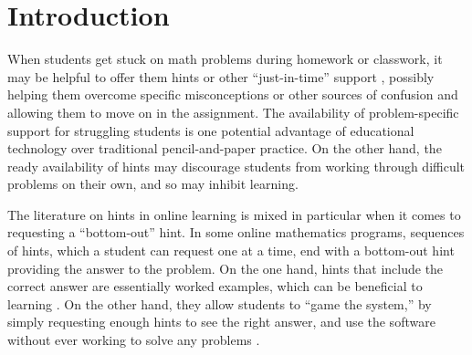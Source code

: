 \documentclass[]{article}
\begin{document}
\clearpage

\section{Introduction}



When students get stuck on math problems during homework or classwork, it may be helpful to offer them hints or other ``just-in-time'' support \cite[e.g][]{jit}, possibly helping them overcome specific misconceptions or other sources of confusion and allowing them to move on in the assignment.
The availability of problem-specific support for struggling students is one potential advantage of educational technology over traditional pencil-and-paper practice.
On the other hand, the ready availability of hints may discourage students from working through difficult problems on their own, and so may inhibit learning.

The literature on hints in online learning is mixed \citep[see, e.g.,][]{aleven2016help,goldin2012learner,sales2021student} in particular when it comes to requesting a ``bottom-out'' hint. In some online mathematics programs, sequences of hints, which a student can request one at a time, end with a bottom-out hint providing the answer to the problem. On the one hand, hints that include the correct answer are essentially worked examples, which can be beneficial to learning \citep[e.g.]{sweller1985use}. On the other hand, they allow students to ``game the system,'' by simply requesting enough hints to see the right answer, and use the software without ever working to solve any problems \citep[e.g.][]{guo2008trying}.
\end{document}
